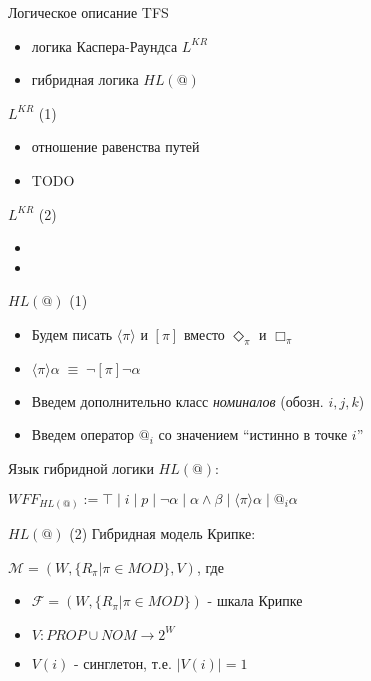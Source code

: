 \documentclass{beamer}
\begin{document}
\begin{frame}{Логическое описание TFS}
\begin{itemize}
	\item логика Каспера-Раундса $L^{KR}$
	\item гибридная логика $HL(@)$
\end{itemize}
\end{frame}

\begin{frame}{$L^{KR}$ (1)}
\begin{itemize}
	\item отношение равенства путей 
	\item TODO
\end{itemize}
\end{frame}

\begin{frame}{$L^{KR}$ (2)}
\begin{itemize}
	\item 
	\item
\end{itemize}
\end{frame}

\begin{frame}{$HL(@)$ (1)}
\begin{itemize}
	\item Будем писать $\langle \pi \rangle$ и $[\pi]$ вместо $\Diamond_\pi$ и $\Box_\pi$
	\item $\langle \pi \rangle \alpha \; \equiv \; \neg [\pi] \neg \alpha$
	\item Введем дополнительно класс \textit{номиналов} (обозн. $i, j, k$)
	\item Введем оператор $@_i$ со значением ``истинно в точке $i$''
\end{itemize}
\bigskip
Язык гибридной логики $HL(@)$:\\
\begin{center}
$WFF_{HL(@)} := \top \; \vert \; i \; \vert \; p \; \vert \; \neg \alpha \; | \; \alpha \wedge \beta \; \vert \; \langle \pi \rangle \alpha \; \vert \; @_i \alpha$
\end{center}
\end{frame}

\begin{frame}{$HL(@)$ (2)}
Гибридная модель Крипке:\\
\bigskip
\begin{center}
$\mathcal{M} = (W, \{R_\pi \vert \pi \in MOD\}, V)$, где\\
\bigskip
\begin{itemize}
	\item $\mathcal{F} = (W, \{R_\pi \vert \pi \in MOD\})$ - шкала Крипке
	\item $V : PROP \cup NOM \to 2^W$
	\item $V(i)$ - синглетон, т.е. $\vert V(i) \vert = 1$
\end{itemize}
\end{center}
\end{frame}
\end{document}
